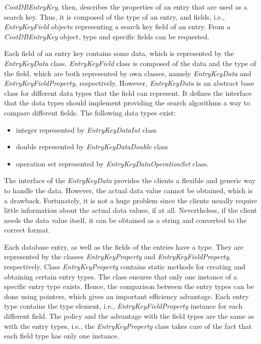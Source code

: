 \documentclass[a4paper,twoside]{tce}
\begin{document}
\emph{CostDBEntryKey}, then, describes the properties of an entry
that are used as a search key. Thus, it is composed of the type of an
entry, and fields, i.e., \emph{EntryKeyField} objects representing a
search key field of an entry. From a \emph{CostDBEntryKey} object,
type and specific fields can be requested.

Each field of an entry key contains some data, which is represented by
the \emph{EntryKeyData} class. \emph{EntryKeyField} class is
composed of the data and the type of the field, which are both
represented by own classes, namely \emph{EntryKeyData} and
\emph{EntryKeyFieldProperty}, respectively. However,
\emph{EntryKeyData} is an abstract base class for different data
types that the field can represent. It defines the interface that the
data types should implement providing the search algorithms a way to
compare different fields. The following data types exist:
\begin{itemize}
\item integer represented by \emph{EntryKeyDataInt} class
\item double represented by \emph{EntryKeyDataDouble} class
\item operation set represented by \emph{EntryKeyDataOperationSet} class.
\end{itemize}
The interface of the \emph{EntryKeyData} provides the clients a
flexible and generic way to handle the data. However, the actual data
value cannot be obtained, which is a drawback. Fortunately, it is not
a huge problem since the clients usually require little information
about the actual data values, if at all. Nevertheless, if the client
needs the data value itself, it can be obtained as a string and
converted to the correct format.

Each database entry, as well as the fields of the entries have a
type. They are represented by the classes \emph{EntryKeyProperty} and
\emph{EntryKeyFieldProperty}, respectively. Class
\emph{EntryKeyProperty} contains static methods for creating and
obtaining certain entry types. The class ensures that only one
instance of a specific entry type exists. Hence, the comparison
between the entry types can be done using pointers, which gives an
important efficiency advantage. Each entry type contains the type
element, i.e., \emph{EntryKeyFieldProperty} instance for each
different field. The policy and the advantage with the field types are
the same as with the entry types, i.e., the \emph{EntryKeyProperty}
class takes care of the fact that each field type has only one
instance.
\end{document}
